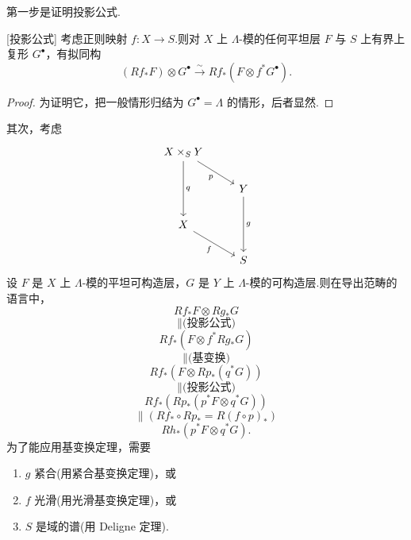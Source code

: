 第一步是证明投影公式.

\begin{proposition}\label{prop:22.5}[投影公式]
考虑正则映射 $f \colon X \to S$.则对 $X$ 上 $\Lambda$-模的任何平坦层 $F$ 与 $S$ 上有界上复形 $G^{\bullet}$，有拟同构
\[
(Rf_{*}F) \otimes G^{\bullet} \xrightarrow{\sim} Rf_{*}(F \otimes f^{*}G^{\bullet}).
\]
\end{proposition}

\begin{proof}
为证明它，把一般情形归结为 $G^{\bullet} = \Lambda$ 的情形，后者显然.
\end{proof}

其次，考虑
\[
\begin{tikzcd}
X \times_{S} Y \arrow[rd, "p"'] \arrow[dd, "q"] & \\
& Y \arrow[dd, "g"] \\
X \arrow[rd, "f"'] & \\
& S
\end{tikzcd}
\]
设 $F$ 是 $X$ 上 $\Lambda$-模的平坦可构造层，$G$ 是 $Y$ 上 $\Lambda$-模的可构造层.则在导出范畴的语言中，
\[
Rf_{*}F \otimes Rg_{*}G
\]
\[
\parallel \text{(投影公式)}
\]
\[
Rf_{*}(F \otimes f^{*}Rg_{*}G)
\]
\[
\parallel \text{(基变换)}
\]
\[
Rf_{*}(F \otimes Rp_{*}(q^{*}G))
\]
\[
\parallel \text{(投影公式)}
\]
\[
Rf_{*}(Rp_{*}(p^{*}F \otimes q^{*}G))
\]
\[
\parallel (Rf_{*} \circ Rp_{*} = R(f \circ p)_{*})
\]
\[
Rh_{*}(p^{*}F \otimes q^{*}G).
\]
为了能应用基变换定理，需要
\begin{enumerate}
  \item $g$ 紧合(用紧合基变换定理)，或
  \item $f$ 光滑(用光滑基变换定理)，或
  \item $S$ 是域的谱(用 Deligne 定理).
\end{enumerate}
